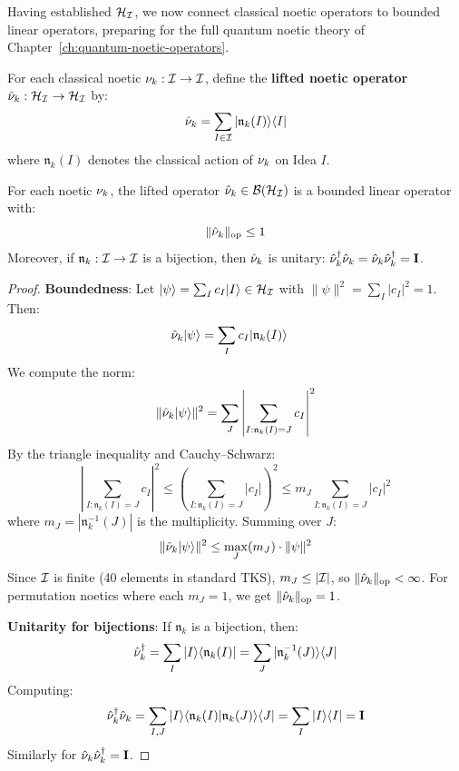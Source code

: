 Having established $\mathcal{H}_{\mathcal{I}}$, we now connect classical noetic operators to bounded linear operators, preparing for the full quantum noetic theory of Chapter~\ref{ch:quantum-noetic-operators}.

\begin{definition}
\label{def:noetic-lifting}
For each classical noetic $\nu_{k} : \mathcal{I} \to \mathcal{I}$, define the \textbf{lifted noetic operator} $\hat{\nu}_k : \mathcal{H}_{\mathcal{I}} \to \mathcal{H}_{\mathcal{I}}$ by:
\[
\hat{\nu}_k = \sum_{I \in \mathcal{I}} |\mathfrak{n}_k(I)\rangle\langle I|
\]
where $\mathfrak{n}_k(I)$ denotes the classical action of $\nu_{k}$ on Idea $I$.
\end{definition}

\begin{theorem}
\label{thm:noetic-bounded}
For each noetic $\nu_{k}$, the lifted operator $\hat{\nu}_k \in \mathcal{B}(\mathcal{H}_{\mathcal{I}})$ is a bounded linear operator with:
\[
\|\hat{\nu}_k\|_{\mathrm{op}} \leq 1
\]
Moreover, if $\mathfrak{n}_k : \mathcal{I} \to \mathcal{I}$ is a bijection, then $\hat{\nu}_k$ is unitary: $\hat{\nu}_k^\dagger \hat{\nu}_k = \hat{\nu}_k \hat{\nu}_k^\dagger = \mathbf{I}$.
\end{theorem}

\begin{proof}
\textbf{Boundedness}: Let $|\psi\rangle = \sum_I c_I |I\rangle \in \mathcal{H}_{\mathcal{I}}$ with $\|\psi\|^2 = \sum_I |c_I|^2 = 1$. Then:
\begin{align}
\hat{\nu}_k |\psi\rangle &= \sum_I c_I |\mathfrak{n}_k(I)\rangle
\end{align}
We compute the norm:
\[
\|\hat{\nu}_k |\psi\rangle\|^2 = \sum_J \left| \sum_{I : \mathfrak{n}_k(I) = J} c_I \right|^2
\]
By the triangle inequality and Cauchy--Schwarz:
\[
\left| \sum_{I : \mathfrak{n}_k(I) = J} c_I \right|^2 \leq \left(\sum_{I : \mathfrak{n}_k(I) = J} |c_I|\right)^2 \leq m_J \sum_{I : \mathfrak{n}_k(I) = J} |c_I|^2
\]
where $m_J = |\mathfrak{n}_k^{-1}(J)|$ is the multiplicity. Summing over $J$:
\[
\|\hat{\nu}_k |\psi\rangle\|^2 \leq \max_J(m_J) \cdot \|\psi\|^2
\]
Since $\mathcal{I}$ is finite (40 elements in standard TKS), $m_J \leq |\mathcal{I}|$, so $\|\hat{\nu}_k\|_{\mathrm{op}} < \infty$. For permutation noetics where each $m_J = 1$, we get $\|\hat{\nu}_k\|_{\mathrm{op}} = 1$.

\textbf{Unitarity for bijections}: If $\mathfrak{n}_k$ is a bijection, then:
\[
\hat{\nu}_k^\dagger = \sum_I |I\rangle\langle \mathfrak{n}_k(I)| = \sum_J |\mathfrak{n}_k^{-1}(J)\rangle\langle J|
\]
Computing:
\[
\hat{\nu}_k^\dagger \hat{\nu}_k = \sum_{I,J} |I\rangle\langle \mathfrak{n}_k(I) | \mathfrak{n}_k(J) \rangle\langle J| = \sum_I |I\rangle\langle I| = \mathbf{I}
\]
Similarly for $\hat{\nu}_k \hat{\nu}_k^\dagger = \mathbf{I}$.
\end{proof}


